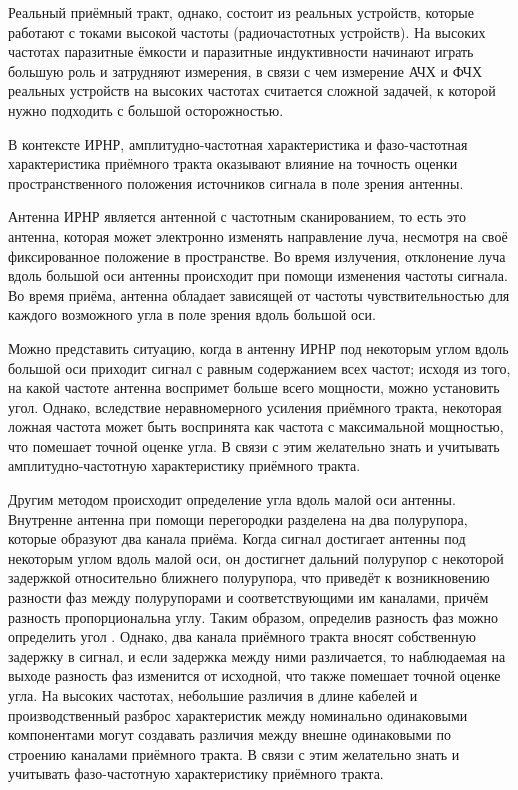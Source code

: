 \documentclass{report}
\begin{document}
Реальный приёмный тракт, однако, состоит из реальных устройств, которые работают с токами высокой частоты (радиочастотных устройств). На высоких частотах паразитные ёмкости и паразитные индуктивности начинают играть большую роль и затрудняют измерения, в связи с чем измерение АЧХ и ФЧХ реальных устройств на высоких частотах считается сложной задачей, к которой нужно подходить с большой осторожностью.


В контексте ИРНР, амплитудно-частотная характеристика и фазо-частотная характеристика приёмного тракта оказывают влияние на точность оценки пространственного положения источников сигнала в поле зрения антенны.

Антенна ИРНР является антенной с частотным сканированием, то есть это антенна, которая может электронно изменять направление луча, несмотря на своё фиксированное положение в пространстве. Во время излучения, отклонение луча вдоль большой оси антенны происходит при помощи изменения частоты сигнала. Во время приёма, антенна обладает зависящей от частоты чувствительностью для каждого возможного угла в поле зрения вдоль большой оси.

Можно представить ситуацию, когда в антенну ИРНР под некоторым углом вдоль большой оси приходит сигнал с равным содержанием всех частот; исходя из того, на какой частоте антенна воспримет больше всего мощности, можно установить угол. Однако, вследствие неравномерного усиления приёмного тракта, некоторая ложная частота может быть воспринята как частота с максимальной мощностью, что помешает точной оценке угла. В связи с этим желательно знать и учитывать амплитудно-частотную характеристику приёмного тракта.

Другим методом происходит определение угла вдоль малой оси антенны. Внутренне антенна при помощи перегородки разделена на два полурупора, которые образуют два канала приёма. Когда сигнал достигает антенны под некоторым углом вдоль малой оси, он достигнет дальний полурупор с некоторой задержкой относительно ближнего полурупора, что приведёт к возникновению разности фаз между полурупорами и соответствующими им каналами, причём разность пропорциональна углу. Таким образом, определив разность фаз можно определить угол \cite{interferometry}. Однако, два канала приёмного тракта вносят собственную задержку в сигнал, и если задержка между ними различается, то наблюдаемая на выходе разность фаз изменится от исходной, что также помешает точной оценке угла. На высоких частотах, небольшие различия в длине кабелей и производственный разброс характеристик между номинально одинаковыми компонентами могут создавать различия между внешне одинаковыми по строению каналами приёмного тракта. В связи с этим желательно знать и учитывать фазо-частотную характеристику приёмного тракта.
\end{document}
